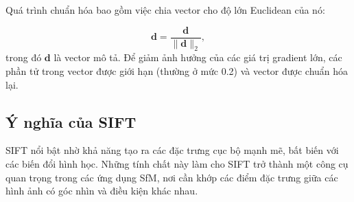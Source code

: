 Quá trình chuẩn hóa bao gồm việc chia vector cho độ lớn Euclidean của nó:

\begin{equation}
\mathbf{d} = \frac{\mathbf{d}}{\|\mathbf{d}\|_2},
\end{equation}
trong đó $\mathbf{d}$ là vector mô tả. Để giảm ảnh hưởng của các giá trị gradient lớn, các phần tử trong vector được giới hạn (thường ở mức 0.2) và vector được chuẩn hóa lại.

\subsection{Ý nghĩa của SIFT}

SIFT nổi bật nhờ khả năng tạo ra các đặc trưng cục bộ mạnh mẽ, bất biến với các biến đổi hình học. Những tính chất này làm cho SIFT trở thành một công cụ quan trọng trong các ứng dụng SfM, nơi cần khớp các điểm đặc trưng giữa các hình ảnh có góc nhìn và điều kiện khác nhau.
